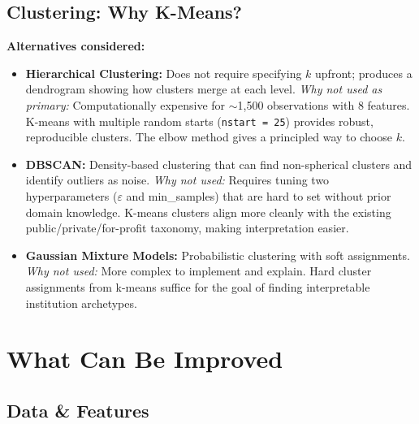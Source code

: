 \documentclass[12pt, letterpaper]{article}
\begin{document}
\subsection{Clustering: Why K-Means?}

\textbf{Alternatives considered:}

\begin{itemize}
  \item \textbf{Hierarchical Clustering:} Does not require specifying $k$ upfront; produces a dendrogram showing how clusters merge at each level. \textit{Why not used as primary:} Computationally expensive for $\sim$1,500 observations with 8 features. K-means with multiple random starts (\texttt{nstart = 25}) provides robust, reproducible clusters. The elbow method gives a principled way to choose $k$.

  \item \textbf{DBSCAN:} Density-based clustering that can find non-spherical clusters and identify outliers as noise. \textit{Why not used:} Requires tuning two hyperparameters ($\varepsilon$ and min\_samples) that are hard to set without prior domain knowledge. K-means clusters align more cleanly with the existing public/private/for-profit taxonomy, making interpretation easier.

  \item \textbf{Gaussian Mixture Models:} Probabilistic clustering with soft assignments. \textit{Why not used:} More complex to implement and explain. Hard cluster assignments from k-means suffice for the goal of finding interpretable institution archetypes.
\end{itemize}

\section{What Can Be Improved}

\subsection{Data \& Features}
\end{document}
